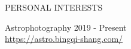 \begin{rSection}{PERSONAL INTERESTS}

\small{
Astrophotography \hfill 2019 - Present
\\ \href{https://astro.bingqi-shang.com/}{\darkblue https://astro.bingqi-shang.com/}
}

\end{rSection}
